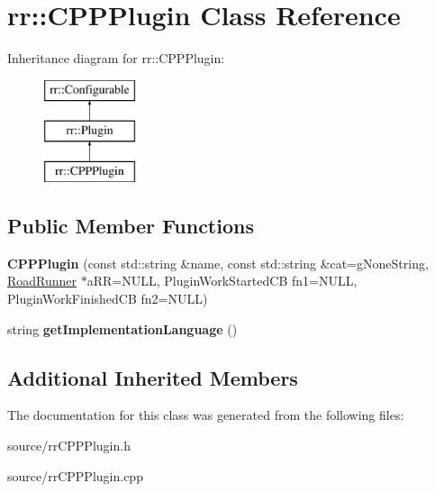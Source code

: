 \hypertarget{classrr_1_1_c_p_p_plugin}{\section{rr\-:\-:C\-P\-P\-Plugin Class Reference}
\label{classrr_1_1_c_p_p_plugin}
}
Inheritance diagram for rr\-:\-:C\-P\-P\-Plugin\-:\begin{figure}[H]
\begin{center}
\leavevmode
\includegraphics[height=3.000000cm]{classrr_1_1_c_p_p_plugin}
\end{center}
\end{figure}
\subsection*{Public Member Functions}
\begin{DoxyCompactItemize}
\item 
\hypertarget{classrr_1_1_c_p_p_plugin_a4bd0900867bd77ef6946bad2aaf3b2f2}{{\bfseries C\-P\-P\-Plugin} (const std\-::string \&name, const std\-::string \&cat=g\-None\-String, \hyperlink{classrr_1_1_road_runner}{Road\-Runner} $\ast$a\-R\-R=N\-U\-L\-L, Plugin\-Work\-Started\-C\-B fn1=N\-U\-L\-L, Plugin\-Work\-Finished\-C\-B fn2=N\-U\-L\-L)}\label{classrr_1_1_c_p_p_plugin_a4bd0900867bd77ef6946bad2aaf3b2f2}

\item 
\hypertarget{classrr_1_1_c_p_p_plugin_a7e29dea54a19366a7dd1de354d227e17}{string {\bfseries get\-Implementation\-Language} ()}\label{classrr_1_1_c_p_p_plugin_a7e29dea54a19366a7dd1de354d227e17}

\end{DoxyCompactItemize}
\subsection*{Additional Inherited Members}


The documentation for this class was generated from the following files\-:\begin{DoxyCompactItemize}
\item 
source/rr\-C\-P\-P\-Plugin.\-h\item 
source/rr\-C\-P\-P\-Plugin.\-cpp\end{DoxyCompactItemize}
